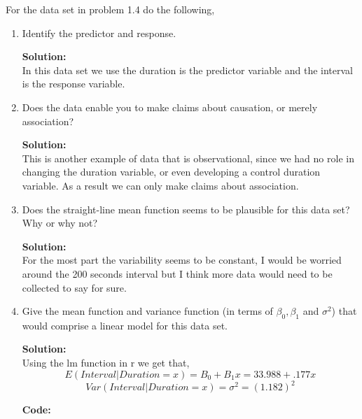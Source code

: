\documentclass[12pt]{article}
\makeatletter
\theoremstyle{homework}
\newenvironment{exercise}[1]
{\def\@currentlabel{#1}\exercisecore}
{\endexercisecore}
\newcommand{\localhead}[1]{\par\smallskip\noindent\textbf{#1}\nobreak\\}%
\newcommand\solution{\localhead{Solution:}}
\makeatother
\begin{document}
\begin{exercise}{4} For the data set in problem 1.4 do the following, 
    \begin{enumerate}
        \item Identify the predictor and response.\\

        \solution In this data set we use the duration is the predictor variable and 
        the interval is the response variable. 
        \vspace{.25in}
        \item Does the data enable you to make claims about causation, or merely association?\\
        \solution This is another example of data that is observational, since we had no role in 
        changing the duration variable, or even developing a control duration variable. As a result we can 
        only make claims about association. 
        \vspace{.25in}
        \item Does the straight-line mean function seems to be plausible for this data set? Why or why not?
        \solution For the most part the variability seems to be constant, I would be worried around the 200 seconds interval
        but I think more data would need to be collected to say for sure.
        \vspace{.25in}
        \item Give the mean function and variance function (in terms of $\beta_0, \beta_1$ and $\sigma^2$) that would 
        comprise a linear model for this data set. 
        \solution Using the lm function in r we get that, 
        \begin{equation*}
            E(Interval|Duration = x) = B_0 + B_1x = 33.988 + .177x 
        \end{equation*}
        \begin{equation*}
            Var(Interval|Duration = x)= \sigma^2 = (1.182)^2
        \end{equation*}

        \textbf{Code:}
            \begin{center}
            
            \end{center}
    \end{enumerate}
\end{exercise}
\newpage
\end{document}
